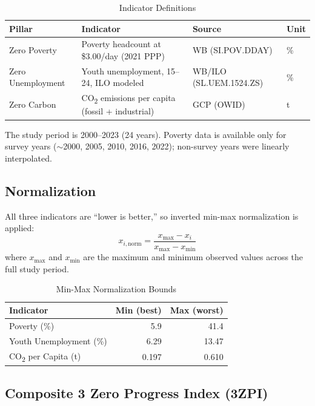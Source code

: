 \documentclass[12pt,a4paper]{article}
\begin{document}
\begin{table}[H]
\centering
\caption{Indicator Definitions}
\label{tab:indicators}
\begin{tabularx}{\textwidth}{lXll}
\toprule
Pillar & Indicator & Source & Unit \\
\midrule
Zero Poverty & Poverty headcount at \$3.00/day (2021 PPP) & WB (SI.POV.DDAY) & \% \\
Zero Unemployment & Youth unemployment, 15--24, ILO modeled & WB/ILO (SL.UEM.1524.ZS) & \% \\
Zero Carbon & CO\textsubscript{2} emissions per capita (fossil + industrial) & GCP (OWID) & t \\
\bottomrule
\end{tabularx}
\end{table}

The study period is 2000--2023 (24 years). Poverty data is available only for survey years ($\sim$2000, 2005, 2010, 2016, 2022); non-survey years were linearly interpolated.

\subsection{Normalization}

All three indicators are ``lower is better,'' so inverted min-max normalization is applied:
\begin{equation}
x_{i,\text{norm}} = \frac{x_{\max} - x_i}{x_{\max} - x_{\min}}
\end{equation}
where $x_{\max}$ and $x_{\min}$ are the maximum and minimum observed values across the full study period.

\begin{table}[H]
\centering
\caption{Min-Max Normalization Bounds}
\label{tab:bounds}
\begin{tabular}{lrr}
\toprule
Indicator & Min (best) & Max (worst) \\
\midrule
Poverty (\%) & 5.9 & 41.4 \\
Youth Unemployment (\%) & 6.29 & 13.47 \\
CO\textsubscript{2} per Capita (t) & 0.197 & 0.610 \\
\bottomrule
\end{tabular}
\end{table}

\subsection{Composite 3 Zero Progress Index (3ZPI)}
\end{document}
